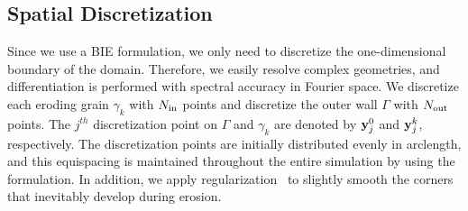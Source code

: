\documentclass{jfm}
\begin{document}
\subsection{Spatial Discretization}
\label{sec:spatialDiscretization}
Since we use a BIE formulation, we only need to discretize the
one-dimensional boundary of the domain.  Therefore, we easily resolve
complex geometries, and differentiation is performed with spectral
accuracy in Fourier space.  We discretize each eroding grain $\gamma_k$
with $N_{\mathrm{in}}$ points and discretize the outer wall $\Gamma$ with
$N_{\mathrm{out}}$ points.  The $j^{th}$ discretization point on $\Gamma$ and
$\gamma_k$ are denoted by ${\mathbf{y}}_j^0$ and ${\mathbf{y}}^k_j$, respectively.  The
discretization points are initially distributed evenly in arclength, and
this equispacing is maintained throughout the entire simulation by using
the {\thL} formulation.  In addition, we apply
regularization~\citep{qua-moo2018} to slightly smooth the corners that
inevitably develop during erosion.
\end{document}
